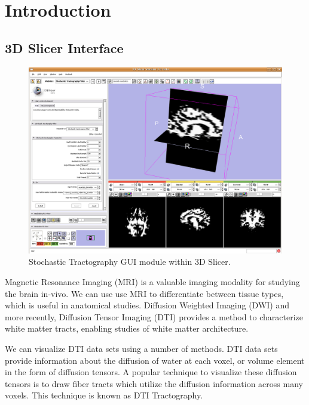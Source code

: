 \chapter{Introduction}

\section{3D Slicer Interface}
\begin{figure}
	\includegraphics[width=0.5\linewidth]{slicermodule}
	\caption{Stochastic Tractography GUI module within 3D Slicer.}
	\label{fig:Intro}
\end{figure}

Magnetic Resonance Imaging (MRI) is a valuable imaging modality for studying the brain in-vivo.  We can use use MRI to differentiate between tissue types, which is useful in anatomical studies.  Diffusion Weighted Imaging (DWI) and more recently, Diffusion Tensor Imaging (DTI) provides a method to characterize white matter tracts, enabling studies of white matter architecture.

We can visualize DTI data sets using a number of methods.  DTI data sets provide information about the diffusion of water at each voxel, or volume element in the form of diffusion tensors.  A popular technique to visualize these diffusion tensors is to draw fiber tracts which utilize the diffusion information across many voxels.  This technique is known as DTI Tractography.

